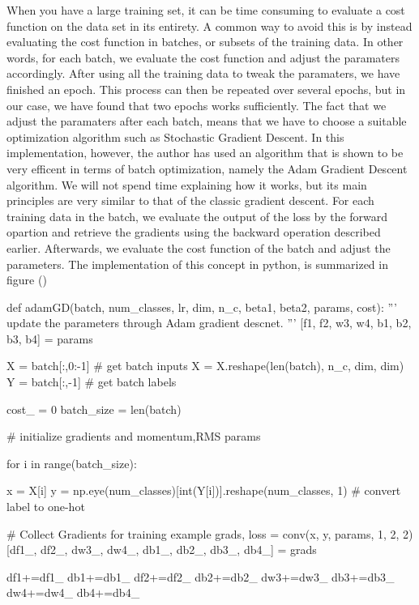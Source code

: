 \startsubsection[title=Batch Optimization]
When you have a large training set, it can be time consuming to evaluate a cost function on the data set in its entirety.
A common way to avoid this is by instead evaluating the cost function in batches, or subsets of the training data.
In other words, for each batch, we evaluate the cost function and adjust the paramaters accordingly. 
After using all the training data to tweak the paramaters, we have finished an epoch.
This process can then be repeated over several epochs, but in our case, we have found that two epochs works sufficiently.
The fact that we adjust the paramaters after each batch, means that we have to choose a suitable optimization algorithm such as Stochastic Gradient Descent.
In this implementation, however, the author has used an algorithm that is shown to be very efficent in terms of batch optimization, namely the Adam Gradient Descent algorithm.
We will not spend time explaining how it works, but its main principles are very similar to that of the classic gradient descent.
For each training data in the batch, we evaluate the output of the loss by the forward opartion and retrieve the gradients using the backward operation described earlier. 
Afterwards, we evaluate the cost function of the batch and adjust the parameters.
The implementation of this concept in python, is summarized in figure ()

\starttyping
def adamGD(batch, num_classes, lr, dim, n_c, beta1, beta2, params, cost):
    '''
    update the parameters through Adam gradient descnet.
    '''
    [f1, f2, w3, w4, b1, b2, b3, b4] = params
    
    X = batch[:,0:-1] # get batch inputs
    X = X.reshape(len(batch), n_c, dim, dim)
    Y = batch[:,-1] # get batch labels
    
    cost_ = 0
    batch_size = len(batch)
    
    # initialize gradients and momentum,RMS params

    for i in range(batch_size):
        
        x = X[i]
        y = np.eye(num_classes)[int(Y[i])].reshape(num_classes, 1) # convert label to one-hot
        
        # Collect Gradients for training example
        grads, loss = conv(x, y, params, 1, 2, 2)
        [df1_, df2_, dw3_, dw4_, db1_, db2_, db3_, db4_] = grads
        
        df1+=df1_
        db1+=db1_
        df2+=df2_
        db2+=db2_
        dw3+=dw3_
        db3+=db3_
        dw4+=dw4_
        db4+=db4_

